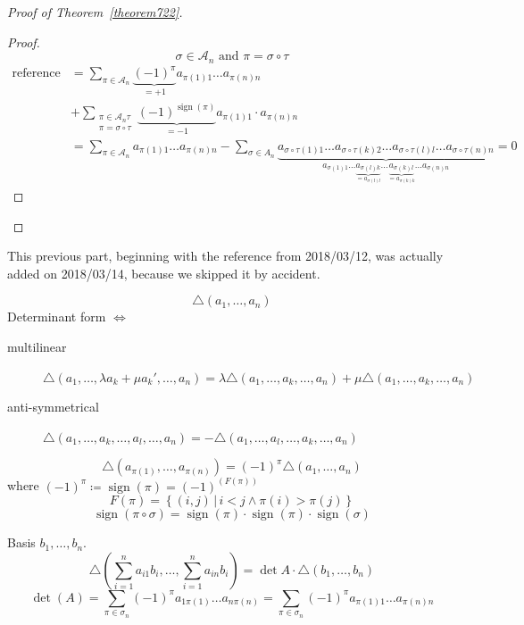 \documentclass{article}
\newcommand{\setdef}[2]{\left\{\left.#1\,\right|\,#2\right\}}
\DeclareMathOperator{\sign}{sign}
\begin{document}
\begin{proof}[Proof of Theorem~\ref{theorem722}]
\begin{enumerate}
\begin{proof}
        \[ \sigma \in \mathcal A_n \text{ and } \pi = \sigma \circ \tau \]
        \begin{align*}
          \text{reference *} &= \sum_{\pi \in \mathcal A_n} \underbrace{(-1)^\pi}_{=+1} a_{\pi(1) 1} \dots a_{\pi(n) n} \\
            &+ \sum_{\substack{\pi \in \mathcal A_n \tau \\ \pi = \sigma \circ \tau}} \underbrace{(-1)^{\sign(\pi)}}_{= -1} a_{\pi(1) 1} \cdot a_{\pi(n) n} \\
            &= \sum_{\pi \in \mathcal A_n} a_{\pi(1) 1} \dots a_{\pi(n) n} - \sum_{\sigma \in A_n} \underbrace{a_{\sigma \circ \tau(1) 1} \dots a_{\sigma \circ \tau(k) 2} \dots a_{\sigma \circ \tau(l) l} \dots a_{\sigma \circ \tau(n) n}}_{a_{\sigma(1) 1} \dots \underbrace{a_{\sigma(l) k}}_{=a_{\sigma(l) l}} \dots \underbrace{a_{\sigma(k) l}}_{= a_{\sigma(k) k}} \dots a_{\sigma(n) n}} = 0
        \end{align*}
      \end{proof}
  \end{enumerate}
\end{proof}

This previous part, beginning with the reference from 2018/03/12, was actually added on 2018/03/14, because we skipped it by accident.

\[ \triangle(a_1, \dots, a_n) \]
Determinant form $\iff$
\begin{description}
  \item[multilinear] $\triangle(a_1, \dots, \lambda a_k + \mu a_k', \dots, a_n) = \lambda \triangle(a_1, \dots, a_k, \dots, a_n) + \mu \triangle(a_1, \dots, a_k, \dots, a_n)$
  \item[anti-symmetrical] $\triangle(a_1, \dots, a_k, \dots, a_l, \dots, a_n) = -\triangle(a_1, \dots, a_l, \dots, a_k, \dots, a_n)$
\end{description}

\[ \triangle (a_{\pi(1)}, \dots, a_{\pi(n)}) = (-1)^\pi \triangle(a_1,\dots,a_n) \]
where $(-1)^\pi \coloneqq \sign(\pi) = (-1)^{(F(\pi))}$
\[ F(\pi) = \setdef{(i,j)}{i < j \land \pi(i) > \pi(j)} \]
\[ \sign(\pi \circ \sigma) = \sign(\pi) \cdot \sign(\pi) \cdot \sign(\sigma) \]

Basis $b_1,\dots,b_n$.
\[ \triangle(\sum_{i=1}^n a_{i1} b_i, \dots, \sum_{i=1}^n a_{in} b_i) = \det{A} \cdot \triangle(b_1, \dots, b_n) \]
\[ \det(A) = \sum_{\pi \in \sigma_n} (-1)^\pi  a_{1\pi(1)} \dots a_{n\pi(n)} = \sum_{\pi \in \sigma_n} (-1)^\pi a_{\pi(1) 1} \dots a_{\pi(n) n} \]
\end{document}
